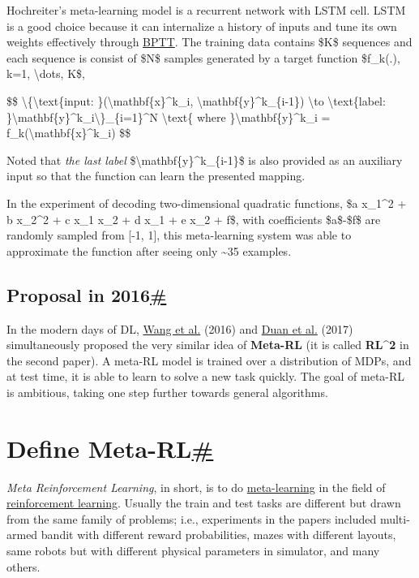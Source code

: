 Hochreiter's meta-learning model is a recurrent network with LSTM cell. LSTM is a good choice because it can internalize a history of inputs and tune its own weights effectively through \href{https://en.wikipedia.org/wiki/Backpropagation_through_time}{BPTT}. The training data contains \$K\$ sequences and each sequence is consist of \$N\$ samples generated by a target function \$f\_k(.), k=1, \textbackslash dots, K\$,

\$\$ \textbackslash\{\textbackslash text\{input: \}(\textbackslash mathbf\{x\}\^{}k\_i, \textbackslash mathbf\{y\}\^{}k\_\{i-1\}) \textbackslash to \textbackslash text\{label: \}\textbackslash mathbf\{y\}\^{}k\_i\textbackslash\}\_\{i=1\}\^{}N \textbackslash text\{ where \}\textbackslash mathbf\{y\}\^{}k\_i = f\_k(\textbackslash mathbf\{x\}\^{}k\_i) \$\$

Noted that \emph{the last label} \$\textbackslash mathbf\{y\}\^{}k\_\{i-1\}\$ is also provided as an auxiliary input so that the function can learn the presented mapping.

In the experiment of decoding two-dimensional quadratic functions, \$a x\_1\^{}2 + b x\_2\^{}2 + c x\_1 x\_2 + d x\_1 + e x\_2 + f\$, with coefficients \$a\$-\$f\$ are randomly sampled from {[}-1, 1{]}, this meta-learning system was able to approximate the function after seeing only \textasciitilde35 examples.

\subsection{\texorpdfstring{Proposal in 2016\hyperref[proposal-in-2016]{\#}}{Proposal in 2016\#}}\label{proposal-in-2016}

In the modern days of DL, \href{https://arxiv.org/abs/1611.05763}{Wang et al.} (2016) and \href{https://arxiv.org/abs/1611.02779}{Duan et al.} (2017) simultaneously proposed the very similar idea of \textbf{Meta-RL} (it is called \textbf{RL\^{}2} in the second paper). A meta-RL model is trained over a distribution of MDPs, and at test time, it is able to learn to solve a new task quickly. The goal of meta-RL is ambitious, taking one step further towards general algorithms.

\section{\texorpdfstring{Define Meta-RL\hyperref[define-meta-rl]{\#}}{Define Meta-RL\#}}\label{define-meta-rl}

\emph{Meta Reinforcement Learning}, in short, is to do \href{https://lilianweng.github.io/posts/2018-11-30-meta-learning/}{meta-learning} in the field of \href{https://lilianweng.github.io/posts/2018-02-19-rl-overview/}{reinforcement learning}. Usually the train and test tasks are different but drawn from the same family of problems; i.e., experiments in the papers included multi-armed bandit with different reward probabilities, mazes with different layouts, same robots but with different physical parameters in simulator, and many others.

